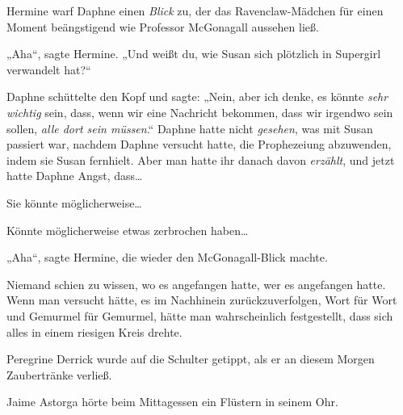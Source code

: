 Hermine warf Daphne einen \emph{Blick} zu, der das Ravenclaw-Mädchen für einen Moment beängstigend wie Professor McGonagall aussehen ließ.

„Aha“, sagte Hermine.
„Und weißt du, wie Susan sich plötzlich in Supergirl verwandelt hat?“

Daphne schüttelte den Kopf und sagte:
„Nein, aber ich denke, es könnte \emph{sehr wichtig} sein, dass, wenn wir eine Nachricht bekommen, dass wir irgendwo sein sollen, \emph{alle dort sein müssen}.“ Daphne hatte nicht \emph{gesehen}, was mit Susan passiert war, nachdem Daphne versucht hatte, die Prophezeiung abzuwenden, indem sie Susan fernhielt. Aber man hatte ihr danach davon \emph{erzählt}, und jetzt hatte Daphne Angst, dass…

Sie könnte möglicherweise…

Könnte möglicherweise etwas zerbrochen haben…

„Aha“, sagte Hermine, die wieder den McGonagall-Blick machte.

\later

Niemand schien zu wissen, wo es angefangen hatte, wer es angefangen hatte. Wenn man versucht hätte, es im Nachhinein zurückzuverfolgen, Wort für Wort und Gemurmel für Gemurmel, hätte man wahrscheinlich festgestellt, dass sich alles in einem riesigen Kreis drehte.

Peregrine Derrick wurde auf die Schulter getippt, als er an diesem Morgen Zaubertränke verließ.

Jaime Astorga hörte beim Mittagessen ein Flüstern in seinem Ohr.


